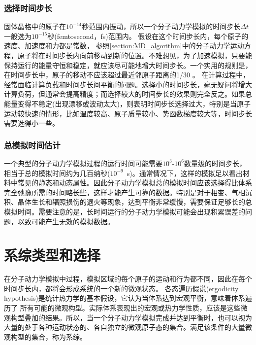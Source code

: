 \subsubsection{选择时间步长}
固体晶格中的原子在$10^{-14}$秒范围内振动，所以一个分子动力学模拟的时间步长$\Delta t$一般选为$10^{-15}$秒\textrm{(femtosecond，fs)}范围内。%
假设在这个时间步长内，每个原子的速度、加速度和力都是常数，%
参照\ref{section:MD_algorithm}中的分子动力学运动方程，原子将在时间步长内向前移动到新的位置。不难想见，为了加速模拟，只要能保持运行的能量守恒和稳定，就应该尽可能地增大时间步长。一个实用的规则是，在时间步长中，原子的移动不应该超过最近邻原子距离的1/30%
。
在计算过程中，经常面临计算负载和时间步长间平衡的问题。选择小的时间步长，毫无疑问将增大计算负荷，但通常会提高精度；而选择较大的时间步长的效果则完全反之。如果总能量变得不稳定(出现漂移或波动太大)，则表明时间步长选择过大，特别是当原子运动较快速的情形，比如温度较高、原子质量较小、势函数梯度较大等，时间步长需要选得小一些。

\subsubsection{总模拟时间估计}
一个典型的分子动力学模拟过程的运行时间可能需要$10^3$-$10^6$数量级的时间步长，相当于总的模拟时间约为几百纳秒($10^{-9}$~\textrm{s})。通常情况下，这样的模拟足以看出材料中常见的静态和动态属性。因此分子动力学模拟总的模拟时间应该选择得比体系完全弛豫所需的时间略长些，这样才能产生可靠的数据。特别是对于相变、气相沉积、晶体生长和辐照损伤的退火等现象，达到平衡非常缓慢，需要保证足够长的总模拟时间。需要注意的是，长时间运行的分子动力学模拟可能会出现积累误差的问题，以致可能产生无效的模拟数据。

\section{系综类型和选择}
在分子动力学模拟中过程，模拟区域的每个原子的运动和行为都不同，因此在每个时间步长内，都将会形成系统的一个新的微观状态。
各态遍历假说\textrm{(ergodicity hypothesis)}是统计热力学的基本假设，它认为当体系达到宏观平衡，意味着体系遍历了%
所有可能的微观构型。实际体系表现出的宏观或热力学性质，应该是这些微观构型叠加的结果。所以，当一个分子动力学模拟完成并达到平衡时，也可以视为大量的处于各种运动状态的、各自独立的微观原子态的集合。满足该条件的大量微观构型的集合，称为系综。


